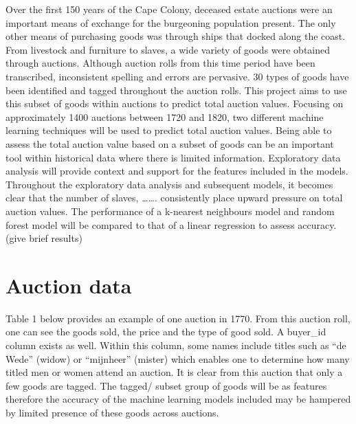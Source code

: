 \documentclass[11pt,preprint, authoryear]{elsarticle}
\numberwithin{equation}{section}
\numberwithin{figure}{section}
\numberwithin{table}{section}
\begin{document}
Over the first 150 years of the Cape Colony, deceased estate auctions
were an important means of exchange for the burgeoning population
present. The only other means of purchasing goods was through ships that
docked along the coast. From livestock and furniture to slaves, a wide
variety of goods were obtained through auctions. Although auction rolls
from this time period have been transcribed, inconsistent spelling and
errors are pervasive. 30 types of goods have been identified and tagged
throughout the auction rolls. This project aims to use this subset of
goods within auctions to predict total auction values. Focusing on
approximately 1400 auctions between 1720 and 1820, two different machine
learning techniques will be used to predict total auction values. Being
able to assess the total auction value based on a subset of goods can be
an important tool within historical data where there is limited
information. Exploratory data analysis will provide context and support
for the features included in the models. Throughout the exploratory data
analysis and subsequent models, it becomes clear that the number of
slaves, \ldots\ldots. consistently place upward pressure on total
auction values. The performance of a k-nearest neighbours model and
random forest model will be compared to that of a linear regression to
assess accuracy. (give brief results)

\hypertarget{auction-data}{%
\section{Auction data}\label{auction-data}}

Table 1 below provides an example of one auction in 1770. From this
auction roll, one can see the goods sold, the price and the type of good
sold. A buyer\_id column exists as well. Within this column, some names
include titles such as ``de Wede'' (widow) or ``mijnheer'' (mister)
which enables one to determine how many titled men or women attend an
auction. It is clear from this auction that only a few goods are tagged.
The tagged/ subset group of goods will be as features therefore the
accuracy of the machine learning models included may be hampered by
limited presence of these goods across auctions.
\end{document}
